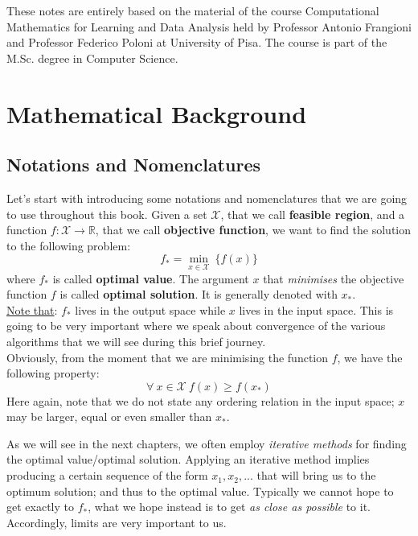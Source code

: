\par These notes are entirely based on the material of the course Computational Mathematics for Learning and Data Analysis held by Professor Antonio Frangioni and Professor Federico Poloni at University of Pisa. The course is part of the M.Sc. degree in Computer Science.

\section{Mathematical Background}
\subsection{Notations and Nomenclatures}
\par Let's start with introducing some notations and nomenclatures that we are going to use throughout this book. Given a set $\mathcal{X}$, that we call \textbf{feasible region}, and a function $f : \mathcal{X} \rightarrow \mathbb{R}$, that we call \textbf{objective function}, we want to find the solution to the following problem:
\begin{equation}
    f_{*} = \min_{x \in \mathcal{X}}\ \{f(x)\}
    \label{eq:opt_problem_def}
\end{equation}
where $f_{*}$ is called \textbf{optimal value}. The argument $x$ that \textit{minimises} the objective function $f$ is called \textbf{optimal solution}. It is generally denoted with $x_{*}$.\\[5px]
%
\underline{Note that}: $f_{*}$ lives in the output space while $x$ lives in the input space. This is going to be very important where we speak about convergence of the various algorithms that we will see during this brief journey.\\[5px]
%
Obviously, from the moment that we are minimising the function $f$, we have the following property:
\[
    \forall\ x \in \mathcal{X}\ f(x) \geq f(x_{*})
\]
Here again, note that we do not state any ordering relation in the input space; $x$ may be larger, equal or even smaller than $x_{*}$.
\par As we will see in the next chapters, we often employ \textit{iterative methods} for finding the optimal value/optimal solution. Applying an iterative method implies producing a certain sequence of the form $x_1, x_2, ...$ that will bring us to the optimum solution; and thus to the optimal value. Typically we cannot hope to get exactly to $f_{*}$, what we hope instead is to get \textit{as close as possible} to it. Accordingly, limits are very important to us.
